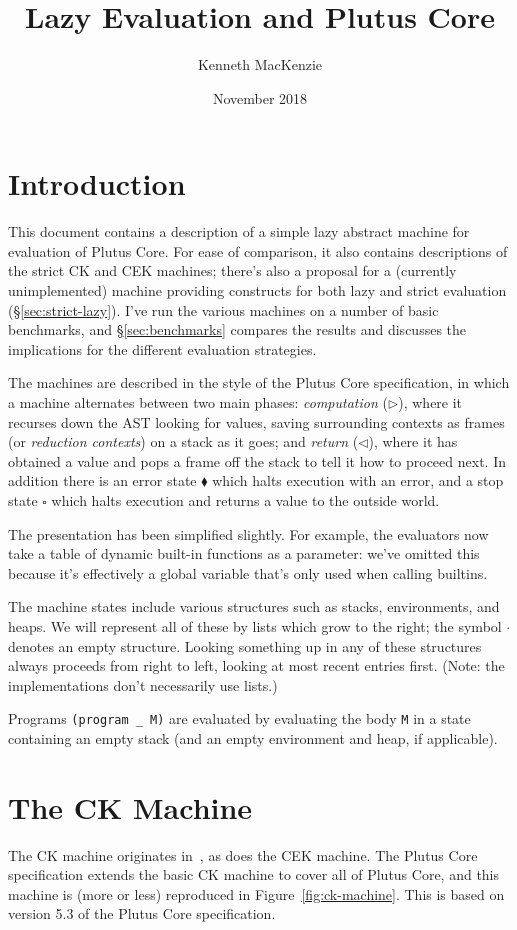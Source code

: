 \documentclass[a4paper]{article}
\author{Kenneth MacKenzie}
\date{November 2018}
\title{Lazy Evaluation and Plutus Core}
\begin{document}
\maketitle
\section{Introduction}
This document contains a description of a simple lazy abstract machine
for evaluation of Plutus Core.  For ease of comparison, it also
contains descriptions of the strict CK and CEK machines; there's also
a proposal for a (currently unimplemented) machine providing
constructs for both lazy and strict evaluation
(\S\ref{sec:strict-lazy}).  I've run the various machines on a
number of basic benchmarks, and \S\ref{sec:benchmarks} compares
the results and discusses the implications for the different
evaluation strategies.

The machines are described in the style of the Plutus Core
specification, in which a machine alternates between two main phases:
\textit{computation} ($\triangleright$), where it recurses down the
AST looking for values, saving surrounding contexts as frames (or
\textit{reduction contexts}) on a stack as it goes; and
\textit{return} ($\triangleleft$), where it has obtained a value and
pops a frame off the stack to tell it how to proceed next.  In
addition there is an error state $\blacklozenge$ which halts execution
with an error, and a stop state $\square$ which halts execution and
returns a value to the outside world. 

The presentation has been simplified slightly. For example, the
evaluators now take a table of dynamic built-in functions as a
parameter: we've omitted this because it's effectively a global
variable that's only used when calling builtins.

The machine states include various structures such as stacks,
environments, and heaps.  We will represent all of these by lists
which grow to the right; the symbol $\cdot$ denotes an empty
structure.  Looking something up in any of these structures always
proceeds from right to left, looking at most recent entries first.
(Note: the implementations don't necessarily use lists.)

Programs \texttt{(program \_ M)} are evaluated by evaluating the body
\texttt{M} in a state containing an empty stack (and an empty environment
and heap, if applicable).
 


\section{The CK Machine}
The CK machine originates in~\cite{Felleisen-Cek}, as does the CEK
machine.  The Plutus Core specification extends the basic CK machine
to cover all of Plutus Core, and this machine is (more or less)
reproduced in Figure~\ref{fig:ck-machine}.  This is based on version
5.3 of the Plutus Core specification.
\end{document}
